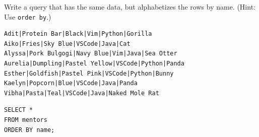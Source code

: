 \begin{blocksection}
Write a query that has the same data, but alphabetizes the rows by name. (Hint: Use \lstinline$order by$.)

\begin{lstlisting}
Adit|Protein Bar|Black|Vim|Python|Gorilla
Aiko|Fries|Sky Blue|VSCode|Java|Cat
Alyssa|Pork Bulgogi|Navy Blue|Vim|Java|Sea Otter
Aurelia|Dumpling|Pastel Yellow|VSCode|Python|Panda
Esther|Goldfish|Pastel Pink|VSCode|Python|Bunny
Kaelyn|Popcorn|Blue|VSCode|Java|Panda
Vibha|Pasta|Teal|VSCode|Java|Naked Mole Rat
\end{lstlisting}

\begin{solution}[1in]
\begin{lstlisting}
SELECT * 
FROM mentors 
ORDER BY name;
\end{lstlisting}
\end{solution}
\end{blocksection}
